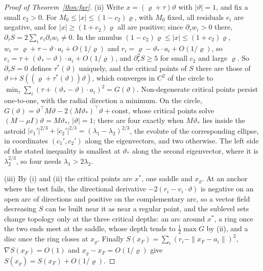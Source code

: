 \begin{proof}[Proof of Theorem~\ref{thm:far}]
(ii) Write $x = (\varrho + \tau)\vartheta$ with $|\vartheta| = 1$, and fix a small $c_2 > 0$. For $M_0 \le |x| \le (1 - c_2)\varrho$,
with $M_0$ fixed, all residuals $e_i$ are negative, and for $|x| \ge (1 + c_2)\varrho$ all are positive; since
$\partial_\tau w_i > 0$ there, $\partial_\tau S = 2\sum_i e_i\partial_\tau w_i \ne 0$. In the annulus
$(1 - c_2)\varrho \le |x| \le (1 + c_2)\varrho$, $w_i = \varrho + \tau - \vartheta\cdot a_i + O(1/\varrho)$ and
$r_i = \varrho - \vartheta_*\cdot a_i + O(1/\varrho)$, so $e_i = \tau + (\vartheta_* - \vartheta)\cdot a_i + O(1/\varrho)$, and
$\partial_\tau^2S \ge 5$ for small $c_2$ and large $\varrho$. So $\partial_\tau S = 0$ defines $\tau^*(\vartheta)$ uniquely, and
the critical points of $S$ there are those of $\vartheta \mapsto S((\varrho + \tau^*(\vartheta))\vartheta)$, which converges in
$C^2$ of the circle to $\min_\tau\sum_i(\tau + (\vartheta_* - \vartheta)\cdot a_i)^2 = G(\vartheta)$. Non-degenerate critical
points persist one-to-one, with the radial direction a minimum. On the circle,
$G(\vartheta) = \vartheta^\top M\vartheta - 2(M\vartheta_*)^\top\vartheta + \mathrm{const}$, whose critical points solve
$(M - \mu I)\vartheta = M\vartheta_*$, $|\vartheta| = 1$; there are four exactly when $M\vartheta_*$ lies inside the astroid
$|c_1'|^{2/3} + |c_2'|^{2/3} = (\lambda_1 - \lambda_2)^{2/3}$, the evolute of the corresponding ellipse, in coordinates
$(c_1', c_2')$ along the eigenvectors, and two otherwise. The left side of the stated inequality is smallest at
$\vartheta_*$ along the second eigenvector, where it is $\lambda_2^{2/3}$, so four needs $\lambda_1 > 2\lambda_2$.

(iii) By (i) and (ii) the critical points are $x^*$, one saddle and $x_\varrho$. At an anchor where the test fails, the
directional derivative $-2(r_i - v_i\cdot\vartheta)$ is negative on an open arc of directions and positive on the
complementary arc, so a vector field decreasing $S$ can be built near it as near a regular point, and the sublevel sets
change topology only at the three critical depths: an arc around $x^*$, a ring once the two ends meet at the saddle,
whose depth tends to $\frac12\max G$ by (ii), and a disc once the ring closes at $x_\varrho$. Finally
$S(x_F) = \sum_i(r_i - \|x_F - a_i\|)^2$, $\nabla S(x_F) = O(1)$ and $x_\varrho - x_F = O(1/\varrho)$ give
$S(x_\varrho) = S(x_F) + O(1/\varrho)$.
\end{proof}

